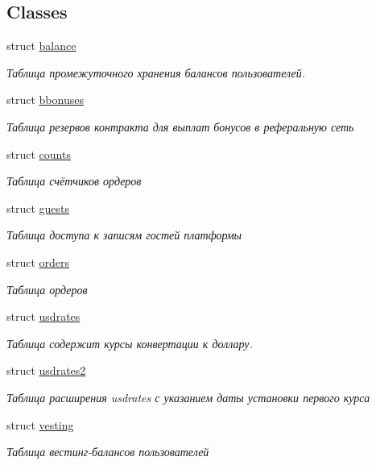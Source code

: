 \subsection*{Classes}
\begin{DoxyCompactItemize}
\item 
struct \mbox{\hyperlink{structp2p_1_1balance}{balance}}
\begin{DoxyCompactList}\small\item\em Таблица промежуточного хранения балансов пользователей. \end{DoxyCompactList}\item 
struct \mbox{\hyperlink{structp2p_1_1bbonuses}{bbonuses}}
\begin{DoxyCompactList}\small\item\em Таблица резервов контракта для выплат бонусов в реферальную сеть \end{DoxyCompactList}\item 
struct \mbox{\hyperlink{structp2p_1_1counts}{counts}}
\begin{DoxyCompactList}\small\item\em Таблица счётчиков ордеров \end{DoxyCompactList}\item 
struct \mbox{\hyperlink{structp2p_1_1guests}{guests}}
\begin{DoxyCompactList}\small\item\em Таблица доступа к записям гостей платформы \end{DoxyCompactList}\item 
struct \mbox{\hyperlink{structp2p_1_1orders}{orders}}
\begin{DoxyCompactList}\small\item\em Таблица ордеров \end{DoxyCompactList}\item 
struct \mbox{\hyperlink{structp2p_1_1usdrates}{usdrates}}
\begin{DoxyCompactList}\small\item\em Таблица содержит курсы конвертации к доллару. \end{DoxyCompactList}\item 
struct \mbox{\hyperlink{structp2p_1_1usdrates2}{usdrates2}}
\begin{DoxyCompactList}\small\item\em Таблица расширения usdrates с указанием даты установки первого курса \end{DoxyCompactList}\item 
struct \mbox{\hyperlink{structp2p_1_1vesting}{vesting}}
\begin{DoxyCompactList}\small\item\em Таблица вестинг-\/балансов пользователей \end{DoxyCompactList}\end{DoxyCompactItemize}
